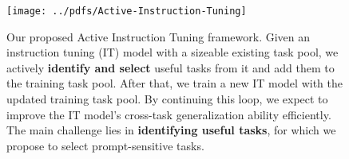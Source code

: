 \begin{figure}
    \centering
    \texttt{[image: ../pdfs/Active-Instruction-Tuning]}
    \vspace{-2em}
    \caption{\footnotesize Our proposed Active Instruction Tuning framework. Given an instruction tuning (IT) model with a sizeable existing task pool, we actively \textbf{identify and select} useful tasks from it and add them to the training task pool. After that, we train a new IT model with the updated training task pool. By continuing this loop, we expect to improve the IT model's cross-task generalization ability efficiently. The main challenge lies in \textbf{identifying useful tasks}, for which we propose to select prompt-sensitive tasks.}
    \vspace{-1em}
    \label{fig:overall-pipeline}
\end{figure}